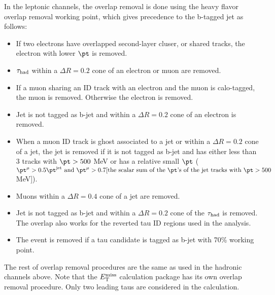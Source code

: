 In the leptonic channels, the overlap removal is done using the heavy flavor overlap removal working point, which gives precedence to the b-tagged jet as follows:
\begin{itemize}
\item If two electrons have overlapped second-layer cluser, or shared tracks, the electron with lower $\pt$ is removed.
\item $\tau_\text{had}$ within a $\Delta R=0.2$ cone of an electron or muon are removed.
\item If a muon sharing an ID track with an electron and the muon is calo-tagged, the muon is removed. Otherwise the electron is removed.
\item Jet is not tagged as b-jet and within a $\Delta R=0.2$ cone of an electron is removed.
\item When a muon ID track is ghost associated to a jet or within a $\Delta R=0.2$ cone of a jet, the jet is removed if it is not tagged as b-jet and has either less than 3 tracks with $\pt>500$ MeV or
  has a relative small $\pt$ ($\pt^{\mu}>0.5\pt^{\text{jet}} \text{ and } \pt^{\mu}>0.7[\text{the scalar sum of the } \pt \text{'s of the jet tracks with } \pt>500$ MeV]).
\item Muons within a $\Delta R=0.4$ cone of a jet are removed.
\item Jet is not tagged as b-jet and within a $\Delta R=0.2$ cone of the $\tau_\text{had}$ is removed. The overlap also works for the reverted tau ID regions used in the analysis.
\item The event is removed if a tau candidate is tagged as b-jet with 70\% working point.
\end{itemize}

The rest of overlap removal procedures are the same as used in the hadronic channels above. 
Note that the $E_{\text{T}}^{\text{miss}}$ calculation package has its own overlap removal procedure. Only two leading taus are considered in the calculation.